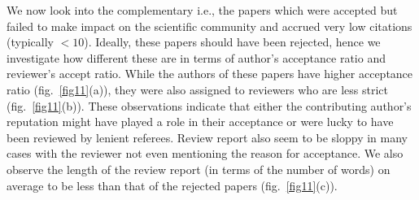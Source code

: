  We now look into the complementary i.e., the papers which were accepted but failed to make impact on the scientific community and accrued very low citations (typically $< 10$). Ideally, these papers should have been rejected, hence we investigate how different these are in terms of author's acceptance ratio and reviewer's accept ratio. While the authors of these papers have higher acceptance ratio (fig.~\ref{fig11}(a)), they were also assigned to reviewers who are less strict (fig.~\ref{fig11}(b)). These observations indicate that either the contributing author's reputation might have played a role in their acceptance or were lucky to have been reviewed by lenient referees. Review report also seem to be sloppy in many cases with the reviewer not even mentioning the reason for acceptance. We also observe the length of the review report (in terms of the number of words) on average to be less than that of the rejected papers (fig.~\ref{fig11}(c)). 
